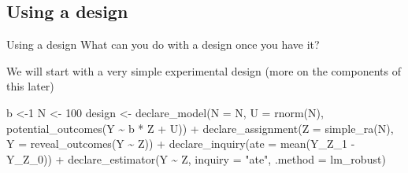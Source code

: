 \documentclass[
  11pt,
  ignorenonframetext,
]{beamer}
\newenvironment{Shaded}{\begin{snugshade}}{\end{snugshade}}
\newcommand{\AttributeTok}[1]{\textcolor[rgb]{0.40,0.45,0.13}{#1}}
\newcommand{\DecValTok}[1]{\textcolor[rgb]{0.68,0.00,0.00}{#1}}
\newcommand{\FunctionTok}[1]{\textcolor[rgb]{0.28,0.35,0.67}{#1}}
\newcommand{\NormalTok}[1]{\textcolor[rgb]{0.00,0.23,0.31}{#1}}
\newcommand{\OtherTok}[1]{\textcolor[rgb]{0.00,0.23,0.31}{#1}}
\newcommand{\SpecialCharTok}[1]{\textcolor[rgb]{0.37,0.37,0.37}{#1}}
\newcommand{\StringTok}[1]{\textcolor[rgb]{0.13,0.47,0.30}{#1}}
\begin{document}
\hypertarget{using-a-design}{%
\subsection{Using a design}\label{using-a-design}}

\begin{frame}[fragile]{Using a design}
What can you do with a design once you have it?

We will start with a very simple experimental design (more on the
components of this later)

\begin{Shaded}
\begin{Highlighting}[]
\NormalTok{b }\OtherTok{\textless{}{-}}\DecValTok{1}
\NormalTok{N }\OtherTok{\textless{}{-}} \DecValTok{100}
\NormalTok{design }\OtherTok{\textless{}{-}} 
  \FunctionTok{declare\_model}\NormalTok{(}\AttributeTok{N =}\NormalTok{ N, }\AttributeTok{U =} \FunctionTok{rnorm}\NormalTok{(N), }\FunctionTok{potential\_outcomes}\NormalTok{(Y }\SpecialCharTok{\textasciitilde{}}\NormalTok{ b }\SpecialCharTok{*}\NormalTok{ Z }\SpecialCharTok{+}\NormalTok{ U)) }\SpecialCharTok{+} 
  \FunctionTok{declare\_assignment}\NormalTok{(}\AttributeTok{Z =} \FunctionTok{simple\_ra}\NormalTok{(N), }\AttributeTok{Y =} \FunctionTok{reveal\_outcomes}\NormalTok{(Y }\SpecialCharTok{\textasciitilde{}}\NormalTok{ Z)) }\SpecialCharTok{+} 
  \FunctionTok{declare\_inquiry}\NormalTok{(}\AttributeTok{ate =} \FunctionTok{mean}\NormalTok{(Y\_Z\_1 }\SpecialCharTok{{-}}\NormalTok{ Y\_Z\_0)) }\SpecialCharTok{+} 
  \FunctionTok{declare\_estimator}\NormalTok{(Y }\SpecialCharTok{\textasciitilde{}}\NormalTok{ Z, }\AttributeTok{inquiry =} \StringTok{"ate"}\NormalTok{, }\AttributeTok{.method =}\NormalTok{ lm\_robust)}
\end{Highlighting}
\end{Shaded}
\end{frame}
\end{document}

